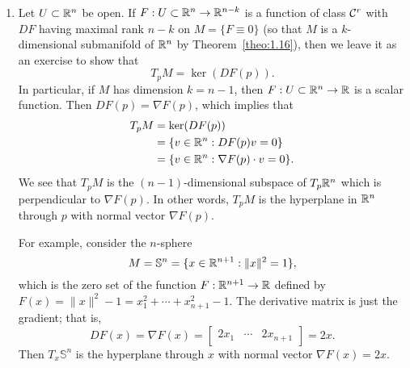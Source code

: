 \begin{enumerate}[(1)]
    \item Let $U \subset \mathbb{R}^n$ be open. If $F : U \subset \mathbb{R}^n \to \mathbb{R}^{n-k}$ is a function of 
    class ${\cal C}^r$ with $DF$ having maximal rank $n-k$ on $M = \{F \equiv 0\}$ 
    (so that $M$ is a $k$-dimensional submanifold of $\mathbb{R}^n$ by Theorem~\ref{theo:1.16}), 
    then we leave it as an exercise to show that 
    \[ T_pM = \ker(DF(p)). \] 
    In particular, if $M$ has dimension $k = n-1$, then $F : U \subset \mathbb{R}^n \to \mathbb{R}$ is a 
    scalar function. Then $DF(p) = \nabla F(p)$, which implies that 
    \begin{align*}
        T_pM &= \ker(DF(p)) \\ 
        &= \{v \in \mathbb{R}^n : DF(p)v = 0\} \\ 
        &= \{v \in \mathbb{R}^n : \nabla F(p) \cdot v = 0\}.
    \end{align*}
    We see that $T_pM$ is the $(n-1)$-dimensional subspace of $T_p\mathbb{R}^n$ 
    which is perpendicular to $\nabla F(p)$. In other words, $T_pM$ is the 
    hyperplane in $\mathbb{R}^n$ through $p$ with normal vector $\nabla F(p)$. 

    For example, consider the $n$-sphere 
    \[ M = \mathbb{S}^n = \{x \in \mathbb{R}^{n+1} : \|x\|^2 = 1\}, \] 
    which is the zero set of the function $F : \mathbb{R}^{n+1} \to \mathbb{R}$ defined by $F(x) = \|x\|^2 - 1 
    = x_1^2 + \cdots + x_{n+1}^2 - 1$. The derivative matrix is just the gradient; that is, 
    \[ DF(x) = \nabla F(x) = \begin{bmatrix} 2x_1 & \cdots & 2x_{n+1} \end{bmatrix} = 2x. \]
    Then $T_x\mathbb{S}^n$ is the hyperplane through $x$ with normal 
    vector $\nabla F(x) = 2x$.  
\end{enumerate}